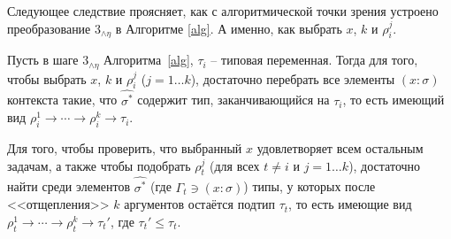 \documentclass[../main.tex]{subfiles}
\begin{document}
Следующее следствие проясняет, как с алгоритмической точки зрения устроено преобразование $3_{\wedge \eta}$ в Алгоритме \ref{alg}. А именно, как выбрать $x$, $k$ и $\rho_i^j$.

\begin{corollary} \label{прояснение}
    Пусть в шаге $3_{\wedge \eta}$ Алгоритма~\ref{alg}, $\tau_i$ -- типовая переменная. Тогда для того, чтобы выбрать $x$, $k$ и $\rho_i^j$ ($j = 1 \dots k$), достаточно перебрать все элементы $(x \colon \sigma)$ контекста такие, что $\hat{\sigma^*}$ содержит тип, заканчивающийся на $\tau_i$, то есть имеющий вид $\rho_i^1 \to \cdots \to \rho_i^k \to \tau_i$. 
    
    Для того, чтобы проверить, что выбранный $x$ удовлетворяет всем остальным задачам, а также чтобы подобрать $\rho_t^j$ (для всех $t \neq i$ и $j = 1 \dots k$), достаточно найти среди элементов $\hat{\sigma^*}$ (где $\Gamma_t \ni (x \colon \sigma)$) типы, у которых после <<отщепления>> $k$ аргументов остаётся подтип $\tau_t$, то есть имеющие вид $\rho_t^1 \to \cdots \to \rho_t^k \to \tau_t'$, где $\tau_t' \leqslant \tau_t$.
    
\end{corollary}
\end{document}
